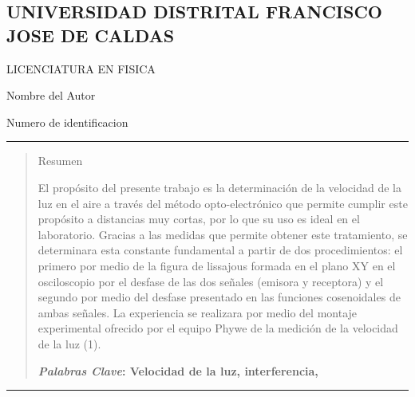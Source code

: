 \documentclass[10pt,a4paper]{article}
\author{Nombre del Autor}
\begin{document}


\begin{center}
\section*{UNIVERSIDAD DISTRITAL FRANCISCO JOSE DE CALDAS}
\end{center}


\begin{center}
LICENCIATURA EN FISICA
\end{center}


\begin{center}
Nombre del Autor
\end{center}


\begin{center}
Numero de identificacion
\end{center}


\vspace*{0.4cm}
\vspace*{-0.4cm}
\begin{center}\rule{0.9\textwidth}{0.1mm} \end{center}

\begin{quote}
\begin{center}
Resumen
\end{center}
El propósito del presente trabajo es la determinación de la velocidad de la luz en el aire a través del método opto-electrónico que permite cumplir este  propósito a distancias muy cortas, por lo que su uso es ideal en el laboratorio. Gracias a las medidas que permite obtener este tratamiento, se determinara  esta constante fundamental a  partir de dos procedimientos: el primero por medio de la figura de lissajous formada en el plano XY en el osciloscopio por el desfase de las dos señales  (emisora y receptora) y el segundo por medio del desfase presentado en las funciones  cosenoidales  de ambas señales. La experiencia  se realizara  por medio del montaje experimental ofrecido por el equipo Phywe de la medición de la velocidad de la luz (1). 

\textbf{\emph{Palabras Clave}: Velocidad de la luz, interferencia,}
\end{quote}

\begin{center}\rule{0.9\textwidth}{0.1mm} \end{center}
\vspace*{0.5cm}
\end{document}

